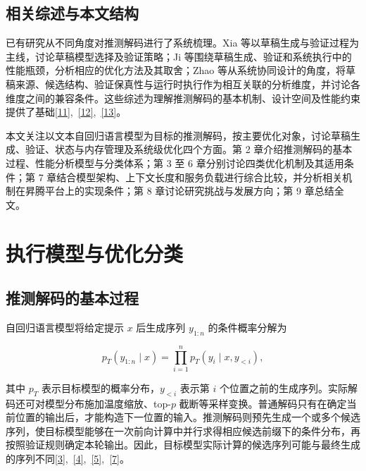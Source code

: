 \documentclass[11pt,a4paper,UTF8,fontset=none,scheme=plain,zihao=-4]{ctexart}
\begin{document}
\hypertarget{section-1-3}{%
\subsection{相关综述与本文结构}\label{section-1-3}}

已有研究从不同角度对推测解码进行了系统梳理。Xia
等以草稿生成与验证过程为主线，讨论草稿模型选择及验证策略；Ji
等围绕草稿生成、验证和系统执行中的性能瓶颈，分析相应的优化方法及其取舍；Zhao
等从系统协同设计的角度，将草稿来源、候选结构、验证保真性与运行时执行作为相互关联的分析维度，并讨论各维度之间的兼容条件。这些综述为理解推测解码的基本机制、设计空间及性能约束提供了基础\protect\hyperlink{ref-survey_xia2024}{{[}11{]}},~\protect\hyperlink{ref-ji2026survey}{{[}12{]}},~\protect\hyperlink{ref-zhao2026survey}{{[}13{]}}。

本文关注以文本自回归语言模型为目标的推测解码，按主要优化对象，讨论草稿生成、验证、状态与内存管理及系统级优化四个方面。第
2 章介绍推测解码的基本过程、性能分析模型与分类体系；第 3 至 6
章分别讨论四类优化机制及其适用条件；第 7
章结合模型架构、上下文长度和服务负载进行综合比较，并分析相关机制在昇腾平台上的实现条件；第
8 章讨论研究挑战与发展方向；第 9 章总结全文。

\hypertarget{section-2}{%
\section{执行模型与优化分类}\label{section-2}}

\hypertarget{section-2-1}{%
\subsection{推测解码的基本过程}\label{section-2-1}}

自回归语言模型将给定提示 \(x\) 后生成序列 \(y_{1:n}\) 的条件概率分解为

\[
p_T(y_{1:n}\mid x)=\prod_{i=1}^{n}p_T(y_i\mid x,y_{<i}),
\]

其中 \(p_T\) 表示目标模型的概率分布，\(y_{<i}\) 表示第 \(i\)
个位置之前的生成序列。实际解码还可对模型分布施加温度缩放、top-\(p\)
截断等采样变换。普通解码只有在确定当前位置的输出后，才能构造下一位置的输入。推测解码则预先生成一个或多个候选序列，使目标模型能够在一次前向计算中并行求得相应候选前缀下的条件分布，再按照验证规则确定本轮输出。因此，目标模型实际计算的候选序列可能与最终生成的序列不同\protect\hyperlink{ref-blockwise}{{[}3{]}},~\protect\hyperlink{ref-leviathan}{{[}4{]}},~\protect\hyperlink{ref-chen}{{[}5{]}},~\protect\hyperlink{ref-specinfer}{{[}7{]}}。
\end{document}
